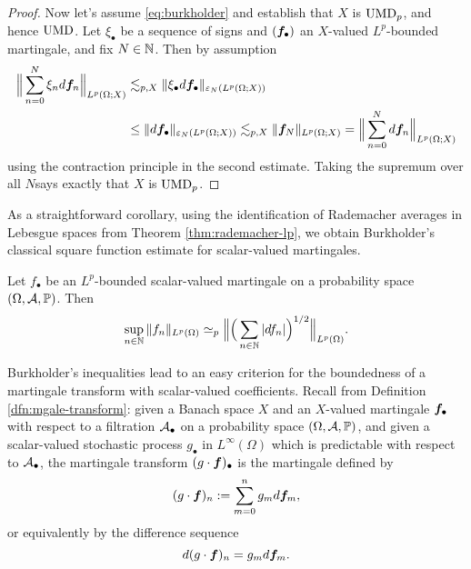 \begin{proof}
Now let's assume \eqref{eq:burkholder} and establish that $X$ is $\mathrm{UMD}_{p}$, and hence $\mathrm{UMD}$.
Let $\xi_{\bullet}$ be a sequence of signs and $(\bm{f}_{\bullet})$ an $X$-valued $L^p$-bounded martingale, and fix $N \in \mathbb{N}$.
Then by assumption
\begin{equation*}
  \begin{aligned}
  \Big\| \sum_{n=0}^{N} \xi_{n} d\bm{f}_{n} \Big\|_{L^p(\Omega;X)}
  &\lesssim_{p,X} \| \xi_{\bullet} d\bm{f}_{\bullet} \|_{\varepsilon_{N}(L^p(\Omega;X))} \\
  &\leq \|d\bm{f}_{\bullet}\|_{\varepsilon_{N}(L^p(\Omega;X))}
  \lesssim_{p,X} \|\bm{f}_{N}\|_{L^p(\Omega;X)} = \Big\| \sum_{n = 0}^{N} d\bm{f}_{n} \Big\|_{L^p(\Omega;X)}
\end{aligned}
\end{equation*}
using the contraction principle in the second estimate.
Taking the supremum over all $N$says exactly that $X$ is $\mathrm{UMD}_{p}$.
\end{proof}

As a straightforward corollary, using the identification of Rademacher averages in Lebesgue spaces from Theorem \ref{thm:rademacher-lp}, we obtain Burkholder's classical square function estimate for scalar-valued martingales.

\begin{cor}
  Let $f_{\bullet}$ be an $L^p$-bounded scalar-valued martingale on a probability space $(\Omega,\mathcal{A},\mathbb{P})$.
  Then
  \begin{equation*}
    \sup_{n \in \mathbb{N}} \|f_{n}\|_{L^p(\Omega)} \simeq_{p} \Big\| \Big( \sum_{n \in \mathbb{N}} |df_{n}| \Big)^{1/2} \Big\|_{L^p(\Omega)}. 
  \end{equation*}
\end{cor}

Burkholder's inequalities lead to an easy criterion for the boundedness of a martingale transform with scalar-valued coefficients.
Recall from Definition \ref{dfn:mgale-transform}: given a Banach space $X$ and an $X$-valued martingale $\bm{f}_{\bullet}$ with respect to a filtration $\mathcal{A}_{\bullet}$ on a probability space $(\Omega,\mathcal{A},\mathbb{P})$, and given a scalar-valued stochastic process $g_{\bullet}$ in $L^\infty(\Omega)$ which is predictable with respect to $\mathcal{A}_{\bullet}$,
the martingale transform $(g \cdot \bm{f})_{\bullet}$ is the martingale defined by
\begin{equation*}
  (g \cdot \bm{f})_n := \sum_{m=0}^n g_m d\bm{f}_m,
\end{equation*}
or equivalently by the difference sequence
\begin{equation*}
  d(g \cdot \bm{f})_{n} = g_{m} d\bm{f}_{m}.
\end{equation*}

